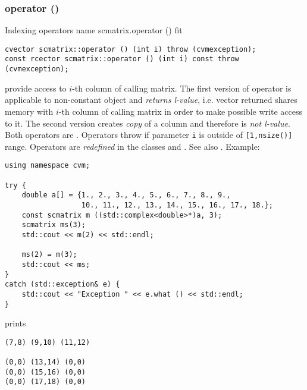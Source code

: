 \subsubsection{operator ()}
Indexing operators%
\pdfdest name {scmatrix.operator ()} fit
\begin{verbatim}
cvector scmatrix::operator () (int i) throw (cvmexception);
const rcector scmatrix::operator () (int i) const throw (cvmexception);
\end{verbatim}
provide access to \hbox{$i$-th} column of calling matrix. The first version
of  operator is applicable to  non-constant object and
\emph{returns  l-value}, i.e.  vector returned shares  memory
with  \hbox{$i$-th} column of calling matrix
in order to make possible write access to it.
The second version creates  \emph{copy} of a column and therefore is
\emph{not  l-value}.
Both operators are \Based.
Operators throw 
if  parameter \verb"i" is outside of \verb"[1,nsize()]" range.
Operators are \emph{redefined}
in the classes 
and .
See also .
Example:
\begin{Verbatim}
using namespace cvm;

try {
    double a[] = {1., 2., 3., 4., 5., 6., 7., 8., 9.,
                  10., 11., 12., 13., 14., 15., 16., 17., 18.};
    const scmatrix m ((std::complex<double>*)a, 3);
    scmatrix ms(3);
    std::cout << m(2) << std::endl;

    ms(2) = m(3);
    std::cout << ms;
}
catch (std::exception& e) {
    std::cout << "Exception " << e.what () << std::endl;
}
\end{Verbatim}
prints
\begin{Verbatim}
(7,8) (9,10) (11,12)

(0,0) (13,14) (0,0)
(0,0) (15,16) (0,0)
(0,0) (17,18) (0,0)
\end{Verbatim}
\newpage




